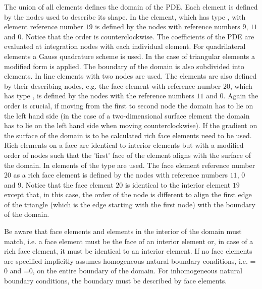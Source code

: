 The union of all elements defines the domain of the PDE.
Each element is defined by the nodes used to describe its shape.
In  the element, which has type , with
element reference number $19$ is defined by the
nodes with reference numbers $9$, $11$ and $0$.
Notice that the order is counterclockwise.
The coefficients of the PDE are evaluated at integration nodes with each
individual element.
For quadrilateral elements a Gauss quadrature scheme is used.
In the case of triangular elements a modified form is applied.
The boundary of the domain is also subdivided into elements.
In  line elements with two nodes are used.
The elements are also defined by their describing nodes, e.g. the face element
with reference number $20$, which has type , is defined by
the nodes with the reference numbers $11$ and $0$.
Again the order is crucial, if moving from the first to second node the domain
has to lie on the left hand side (in the case of a two-dimensional surface
element the domain has to lie on the left hand side when moving
counterclockwise). If the gradient on the surface of the domain is to be
calculated rich face elements need to be used. Rich elements on a face are
identical to interior elements but with a modified order of nodes such that the
'first' face of the element aligns with the surface of the domain.
In  elements of the type  are used.
The face element reference number $20$ as a rich face element is defined by the
nodes with reference numbers $11$, $0$ and $9$.
Notice that the face element $20$ is identical to the interior element $19$
except that, in this case, the order of the node is different to align the first
edge of the triangle (which is the edge starting with the first node) with the
boundary of the domain.

Be aware that face elements and elements in the interior of the domain must
match, i.e. a face element must be the face of an interior element or, in case
of a rich face element, it must be identical to an interior element.
If no face elements are specified \finley implicitly assumes homogeneous
natural boundary conditions,
i.e. =$0$ and =$0$, on the entire boundary of the domain.
For inhomogeneous natural boundary conditions,
the boundary must be described by face elements.

